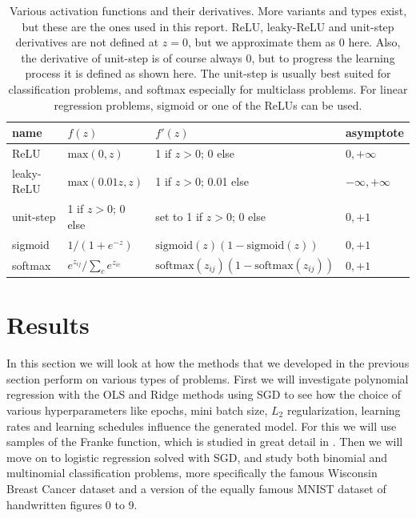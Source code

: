 \documentclass[]{article}
\begin{document}
\begin{table}[!ht]
	\caption{Various activation functions and their derivatives. More variants and types exist, but these are the ones used in this report. ReLU, leaky-ReLU and unit-step derivatives are not defined at $z=0$, but we approximate them as 0 here. Also, the derivative of unit-step is of course always 0, but to progress the learning process it is defined as shown here. The unit-step is usually best suited for classification problems, and softmax especially for multiclass problems. For linear regression problems, sigmoid or one of the ReLUs can be used.}
	\label{tab:activation-funcs}
	\begin{center}
		\begin{tabular}{l|l|l|l}
			\toprule
			name&	$f(z)$&	$f'(z)$&	asymptote \\
			\midrule
			ReLU&	$\mathrm{max}(0,z)$&	1 if $z > 0$; 0 else&	$0,+\infty$ \\
			leaky-ReLU&	$\mathrm{max}(0.01z,z)$&	1 if $z > 0$; 0.01 else&	$-\infty,+\infty$ \\
			unit-step&	1 if $z > 0$; 0 else&	set to 1 if $z > 0$; 0 else&	$0,+1$ \\
			sigmoid&	$1/(1 + e^{-z})$&	$\mathrm{sigmoid}(z)(1 - \mathrm{sigmoid}(z))$	&	$0,+1$ \\
			softmax&	$e^{z_{ij}}/\sum_{c}e^{z_{ic}}$&	$\mathrm{softmax}(z_{ij})(1 - \mathrm{softmax}(z_{ij}))$ &	$0,+1$ \\
			\bottomrule
		\end{tabular}
	\end{center}
\end{table}


\clearpage
\section{Results} \label{results}

In this section we will look at how the methods that we developed in the previous section perform on various types of problems. First we will investigate polynomial regression with the OLS and Ridge methods using SGD to see how the choice of various hyperparameters like epochs, mini batch size, $L_2$ regularization, learning rates and learning schedules influence the generated model. For this we will use samples of the Franke function, which is studied in great detail in \cite{project1}. Then we will move on to logistic regression solved with SGD, and study both binomial and multinomial classification problems, more specifically the famous Wisconsin Breast Cancer dataset and a version of the equally famous MNIST dataset of handwritten figures 0 to 9.
\end{document}
